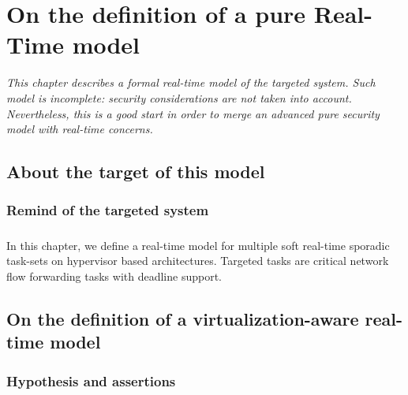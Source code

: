 
\chapter{On the definition of a pure Real-Time model}

\label{chap:rtmodel}

{\it
This chapter describes a formal real-time model of the targeted system.
Such model is incomplete: security considerations are not taken into account.
Nevertheless, this is a good start in order to merge an advanced pure security model with
real-time concerns.

}

\doMinitoc

\section{About the target of this model}

\subsection{Remind of the targeted system}

\paragraph{}
In this chapter, we define a real-time model for multiple soft real-time sporadic task-sets on
hypervisor based architectures. Targeted tasks are critical network flow forwarding tasks with
deadline support.

\section{On the definition of a virtualization-aware real-time model}

\subsection{Hypothesis and assertions}

\paragraph{}

